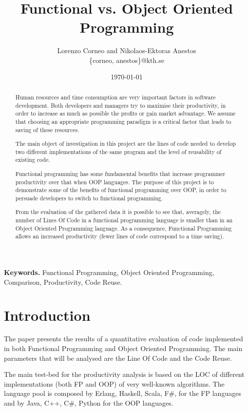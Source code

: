 \documentclass{proc}
\begin{document}
\title{Functional vs. Object Oriented Programming}
\author{Lorenzo Corneo and Nikolaos-Ektoras Anestos \\
	\{corneo, anestos\}@kth.se}
\date{\today}
\maketitle

\begin{abstract}
Human resources and time consumption are very important factors in software development. Both developers and managers try to maximise their productivity, in order to increase as much as possible the profits or gain market advantage. We assume that choosing an appropriate programming paradigm is a critical factor that leads to saving of these resources.

The main object of investigation in this project are the lines of code needed to develop two different implementations of the same program and the level of reusability of existing code.

Functional programming has some fundamental benefits that increase programmer productivity over that when OOP languages. The purpose of this project is to demonstrate some of the benefits of functional programming over OOP, in order to persuade developers to switch to functional programming.

From the evaluation of the gathered data it is possible to see that, averagely, the number of Lines Of Code in a functional programming language is smaller than in an Object Oriented Programming language. As a consequence, Functional Programming allows an increased productivity (fewer lines of code correspond to a time saving).
\end{abstract}

\smallskip
\noindent \textbf{Keywords.} Functional Programming, Object Oriented Programming, Comparison, Productivity, Code Reuse.

\section{Introduction}

The paper presents the results of a quantitative evaluation of code implemented in both Functional Programming and Object Oriented Programming. The main parameters that will be analysed are the Line Of Code and the Code Reuse.

The main test-bed for the productivity analysis is based on the LOC of different implementations (both FP and OOP) of very well-known algorithms. The language pool is composed by Erlang, Haskell, Scala, F\#, for the FP languages and by Java, C++, C\#, Python for the OOP languages.
\end{document}
